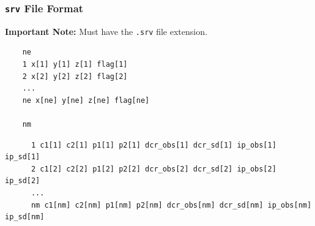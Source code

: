 \documentclass[a4paper,12pt]{article}
\begin{document}
\subsubsection{\texttt{srv} File Format} \label{forward_srv}

\begin{framed}
\noindent \textbf{Important Note:} Must have the \texttt{.srv} file extension.
\end{framed}

\begin{framed}
\begin{verbatim}
    ne
    1 x[1] y[1] z[1] flag[1]
    2 x[2] y[2] z[2] flag[2]
    ...
    ne x[ne] y[ne] z[ne] flag[ne]

    nm
\end{verbatim}

\begingroup
\scriptsize
\begin{verbatim}
      1 c1[1] c2[1] p1[1] p2[1] dcr_obs[1] dcr_sd[1] ip_obs[1] ip_sd[1]
      2 c1[2] c2[2] p1[2] p2[2] dcr_obs[2] dcr_sd[2] ip_obs[2] ip_sd[2]
      ...
      nm c1[nm] c2[nm] p1[nm] p2[nm] dcr_obs[nm] dcr_sd[nm] ip_obs[nm] ip_sd[nm]
\end{verbatim}
\endgroup
\end{framed}
\end{document}
